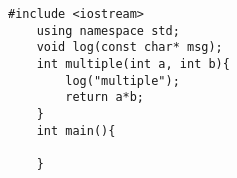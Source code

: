 
\begin{lstlisting}[label={CPP:1},caption={main.cc}]
	#include <iostream>
	using namespace std;
	void log(const char* msg);
	int multiple(int a, int b){
		log("multiple");
		return a*b;
	}
	int main(){
	
	}
\end{lstlisting}




